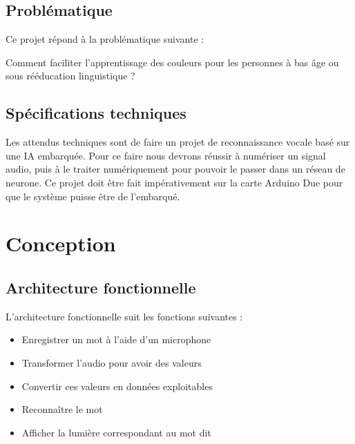 \documentclass[a4paper,11pt]{article}
\begin{document}
\subsection{Problématique}
		
Ce projet répond à la problématique suivante :
\begin{citationbox}
Comment faciliter l'apprentissage des couleurs pour les personnes à bas âge ou sous rééducation linguistique ?
\end{citationbox}
			
\subsection{Spécifications techniques}
Les attendus techniques sont de faire un projet de reconnaissance vocale basé sur une IA embarquée. Pour ce faire nous devrons réussir à numériser un signal audio, puis à le traiter numériquement pour pouvoir le passer dans un réseau de neurone. Ce projet doit être fait impérativement sur la carte Arduino Due pour que le système puisse être de l’embarqué.
			
\section{Conception}
\subsection{Architecture fonctionnelle}
L'architecture fonctionnelle suit les fonctions suivantes :
\begin{itemize}
	\item Enregistrer un mot à l'aide d'un microphone
	\item Transformer l'audio pour avoir des valeurs
	\item Convertir ces valeurs en données exploitables
	\item Reconnaître le mot
	\item Afficher la lumière correspondant au mot dit
\end{itemize}
			
\end{document}
